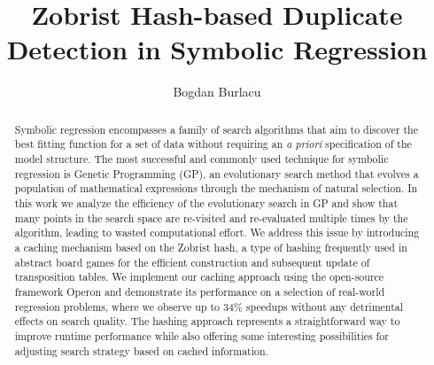 \documentclass[openacc]{rstransa}%
\begin{document}
\title{Zobrist Hash-based Duplicate Detection in Symbolic Regression}
\author{Bogdan Burlacu}

\address{University of Applied Sciences Upper Austria\\
Heuristic and Evolutionary Algorithms Laboratory\\
Softwarepark 11, 4232, Hagenberg, Austria}

\subject{machine learning, symbolic regression}



\def\CPP{C\raisebox{0.5ex}{\tiny\textbf{++}}}

\begin{abstract}
    Symbolic regression encompasses a family of search algorithms that aim to discover the best fitting function for a set of data without requiring an \emph{a priori} specification of the model structure. The most successful and commonly used technique for symbolic regression is Genetic Programming (GP), an evolutionary search method that evolves a population of mathematical expressions through the mechanism of natural selection. In this work we analyze the efficiency of the evolutionary search in GP and show that many points in the search space are re-visited and re-evaluated multiple times by the algorithm, leading to wasted computational effort. We address this issue by introducing a caching mechanism based on the Zobrist hash, a type of hashing frequently used in abstract board games for the efficient construction and subsequent update of transposition tables. We implement our caching approach using the open-source framework Operon and demonstrate its performance on a selection of real-world regression problems, where we observe up to 34\% speedups without any detrimental effects on search quality. The hashing approach represents a straightforward way to improve runtime performance while also offering some interesting possibilities for adjusting search strategy based on cached information.
\end{abstract}
\end{document}
